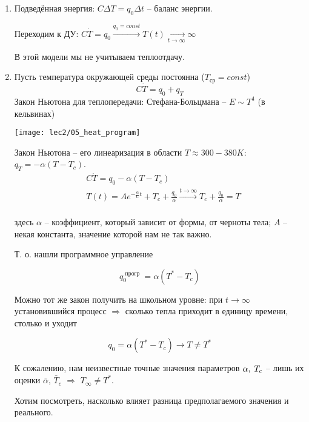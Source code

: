 \documentclass[main.tex]{subfiles}
\begin{document}
\begin{enumerate}
	\item Подведённая энергия: $ C \Delta T = q_0 \Delta t $ -- баланс энергии.

	Переходим к ДУ: $ C \dot T = q_0 \xrightarrow{q_0 = const} T(t) \xrightarrow[t \to \infty]{} \infty $

	В этой модели мы не учитываем теплоотдачу.

	\item Пусть температура окружающей среды постоянна ($ T_{\text{ср}} = const $)
	$$ C \dot T = q_0 + q_T $$
	Закон Ньютона для теплопередачи: Стефана-Больцмана -- $ E \sim T^4 $ (в кельвинах)

    \texttt{[image: lec2/05\_heat\_program]}

    Закон Ньютона -- его линеаризация в области $ T \approx 300-380 K $: $ q_T = - \alpha(T - T_c) $.
	\begin{align*}
		& C\dot T = q_0 - \alpha (T - T_c) \\
		& T(t) = Ae^{-\frac{\alpha}{C}t} + T_c + \frac{q_0}{\alpha} \xrightarrow{t \to \infty} T_c + \frac{q_0}{\alpha} = T \\
	\end{align*}

    здесь $ \alpha $ -- коэффициент, который зависит от формы, от черноты тела; $ A $ -- некая константа, значение которой нам не так важно.

    Т. о. нашли программное управление

    \[ q_0^{\text{ прогр }} = \alpha (T^* - T_c) \]

    \begin{leftbar}
        Можно тот же закон получить на школьном уровне: при $ t \to \infty $ установившийся процесс $ \Rightarrow $
        сколько тепла приходит в единицу времени, столько и уходит

        \[ q_0 = \alpha (T^* - T_c) \longrightarrow T \ne T^* \]
    \end{leftbar}

	К сожалению, нам неизвестные точные значения параметров $ \alpha, \thickspace T_c $ -- лишь их оценки $ \bar \alpha $, $ \bar T_c $ $ \Rightarrow $ $ T_\infty \ne T^* $.

	Хотим посмотреть, насколько влияет разница предполагаемого значения и реального.


\end{enumerate}
\end{document}
